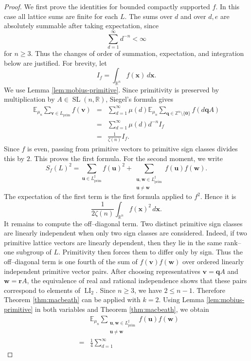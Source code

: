 \documentclass[a4paper,12pt]{article}
\theoremstyle{definition}
\theoremstyle{remark}
\newcommand{\re}{\mathbb R}
\newcommand{\ze}{\mathbb Z}
\newcommand{\ex}{\mathbb E}
\newcommand{\SL}{\operatorname{SL}}
\newcommand{\LI}{\operatorname{LI}}
\newcommand{\prim}{\operatorname{prim}}
\begin{document}
\begin{proof}
We first prove the identities for bounded compactly supported $f$.
In this case all lattice sums are finite for each $L$.
The sums over $d$ and over $d,e$ are absolutely summable after taking expectation, since
$$
\sum_{d=1}^{\infty}d^{-n}<\infty
$$
for $n\ge3$.
Thus the changes of order of summation, expectation, and integration below are justified.
For brevity, let
$$
I_f=\int_{\re^n}f(\bm x)\,d\bm x.
$$
We use Lemma \ref{lem:mobius-primitive}.
Since primitivity is preserved by multiplication by $A\in\SL(n,\re)$, Siegel's formula \cite{Siegel45} gives
\begin{eqnarray*}
\ex_{\mu_n}\sum_{\bm v\in L_{\prim}}f(\bm v)
&=&
\sum_{d=1}^{\infty}\mu(d)
\ex_{\mu_n}
\sum_{\bm q\in\ze^n\setminus\{\bm 0\}}
f(d\bm q A)
\\
&=&
\sum_{d=1}^{\infty}\mu(d)d^{-n} I_f
\\
&=&
\frac{1}{\zeta(n)}I_f.
\end{eqnarray*}
Since $f$ is even, passing from primitive vectors to primitive sign classes divides this by $2$.
This proves the first formula.
For the second moment, we write
$$
S_f(L)^2
=
\sum_{\bm u\in L_{\prim}^\sharp}f(\bm u)^2
+
\sum_{\substack{\bm u,\bm w\in L_{\prim}^\sharp\\
\bm u\ne\bm w}}
f(\bm u)f(\bm w).
$$
The expectation of the first term is the first formula applied to $f^2$.
Hence it is
$$
\frac{1}{2\zeta(n)}
\int_{\re^n}f(\bm x)^2\,d\bm x.
$$
It remains to compute the off--diagonal term.
Two distinct primitive sign classes are linearly independent when only two sign classes are considered.
Indeed, if two primitive lattice vectors are linearly dependent, then they lie in the same rank--one subgroup of $L$.
Primitivity then forces them to differ only by sign.
Thus the off--diagonal term is one fourth of the sum of $f(\bm v)f(\bm w)$ over ordered linearly independent primitive vector pairs.
After choosing representatives $\bm v=\bm qA$ and $\bm w=\bm rA$, the equivalence of real and rational independence shows that these pairs correspond to elements of $\LI_2$.
Since $n\ge3$, we have $2\le n-1$.
Therefore Theorem \ref{thm:macbeath} can be applied with $k=2$.
Using Lemma \ref{lem:mobius-primitive} in both variables and Theorem \ref{thm:macbeath}, we obtain
\begin{eqnarray*}
&&
\ex_{\mu_n}
\sum_{\substack{\bm u,\bm w\in L_{\prim}^\sharp\\
\bm u\ne\bm w}}
f(\bm u)f(\bm w)
\\
&=&
\frac{1}{4}
\sum_{d=1}^{\infty}

\end{eqnarray*}
\end{proof}
\end{document}
